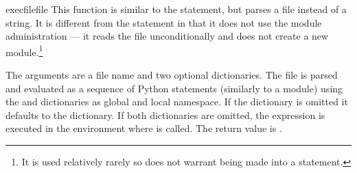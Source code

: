 \begin{funcdesc}{execfile}{file}
  This function is similar to the
   statement, but parses a file instead of a string.  It
  is different from the  statement in that it does not
  use the module administration --- it reads the file unconditionally
  and does not create a new module.\footnote{It is used relatively
  rarely so does not warrant being made into a statement.}

  The arguments are a file name and two optional dictionaries.  The
  file is parsed and evaluated as a sequence of Python statements
  (similarly to a module) using the  and 
  dictionaries as global and local namespace.  If the 
  dictionary is omitted it defaults to the  dictionary.
  If both dictionaries are omitted, the expression is executed in the
  environment where  is called.  The return value is
  .

\end{funcdesc}

